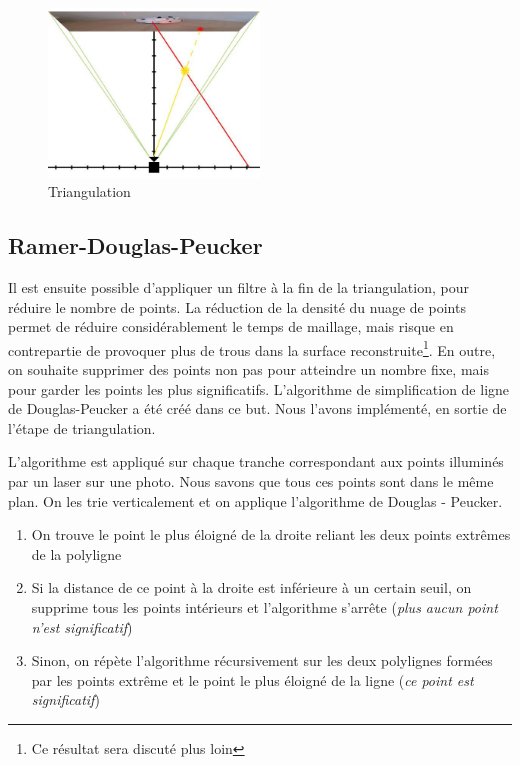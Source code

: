 \documentclass[a4paper,10pt]{report}
\begin{document}
\begin{figure}[H]
\centering
\includegraphics[width=0.5\textwidth]{triangulation_jpg.jpg}
\caption{Triangulation}
\label{unipolar}
\end{figure}

\subsection{Ramer-Douglas-Peucker}
Il est ensuite possible d'appliquer un filtre à la fin de la triangulation, pour réduire le nombre de points. La réduction de la densité du nuage de points permet de réduire considérablement le temps de maillage, mais risque en contrepartie de provoquer plus de trous dans la surface reconstruite\footnote{Ce résultat sera discuté plus loin}. En outre, on souhaite supprimer des points non pas pour atteindre un nombre fixe, mais pour garder les points les plus significatifs. L'algorithme de simplification de ligne de Douglas-Peucker\cite{douglaspeucker} a été créé dans ce but. Nous l'avons implémenté, en sortie de l'étape de triangulation.

L'algorithme est appliqué sur chaque tranche correspondant aux points illuminés par un laser sur une photo. Nous savons que tous ces points sont dans le même plan. On les trie verticalement et on applique l'algorithme de Douglas - Peucker.

\begin{enumerate}
	\item On trouve le point le plus éloigné de la droite reliant les deux points extrêmes de la polyligne
    \item Si la distance de ce point à la droite est inférieure à un certain seuil, on supprime tous les points intérieurs et l'algorithme s'arrête (\textit{plus aucun point n'est significatif})
    \item Sinon, on répète l'algorithme récursivement sur les deux polylignes formées par les points extrême et le point le plus éloigné de la ligne (\textit{ce point est significatif})
\end{enumerate}
\end{document}
